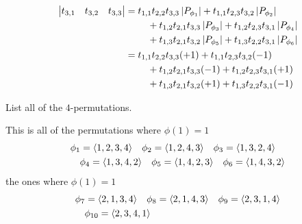 \begin{exercises}
\begin{answer}
\begin{align*}
\begin{vmatrix}
                t_{3,1}  &t_{3,2}  &t_{3,3}
             \end{vmatrix}
             &=\begin{aligned}[t]
                 &t_{1,1}t_{2,2}t_{3,3}\deter{P_{\phi_1}}
                   +t_{1,1}t_{2,3}t_{3,2}\deter{P_{\phi_2}} \\
                 &\hbox{}\quad\hbox{}
                  +t_{1,2}t_{2,1}t_{3,3}\deter{P_{\phi_3}}
                             +t_{1,2}t_{2,3}t_{3,1}\deter{P_{\phi_4}} \\
                 &\hbox{}\quad\hbox{}
                  +t_{1,3}t_{2,1}t_{3,2}\deter{P_{\phi_5}}
                             +t_{1,3}t_{2,2}t_{3,1}\deter{P_{\phi_6}}
               \end{aligned}                                               \\
             &=\begin{aligned}[t]
                 & t_{1,1}t_{2,2}t_{3,3}(+1)
                   +t_{1,1}t_{2,3}t_{3,2}(-1)  \\
                 &\hbox{}\quad\hbox{}
                   +t_{1,2}t_{2,1}t_{3,3}(-1)
                    +t_{1,2}t_{2,3}t_{3,1}(+1) \\
                 &\hbox{}\quad\hbox{}
                   +t_{1,3}t_{2,1}t_{3,2}(+1)
                         +t_{1,3}t_{2,2}t_{3,1}(-1)
               \end{aligned}                                               
          \end{align*}  
     \end{answer}
  \item 
    List all of the $4$-permutations.
    \begin{answer}
      This is all of the permutations where $\phi(1)=1$
      \begin{align*}
        &\phi_1=\langle1,2,3,4\rangle
        \quad
        \phi_2=\langle1,2,4,3\rangle
        \quad
        \phi_3=\langle1,3,2,4\rangle  \\
        &\quad
        \phi_4=\langle1,3,4,2\rangle
        \quad
        \phi_5=\langle1,4,2,3\rangle
        \quad
        \phi_6=\langle1,4,3,2\rangle
      \end{align*}
      the ones where $\phi(1)=1$
      \begin{align*}
        &\phi_7=\sequence{2,1,3,4}
        \quad
        \phi_8=\sequence{2,1,4,3}
        \quad
        \phi_9=\sequence{2,3,1,4}    \\
        &\quad
        \phi_{10}=\sequence{2,3,4,1}

\end{align*}
\end{answer}
\end{exercises}
